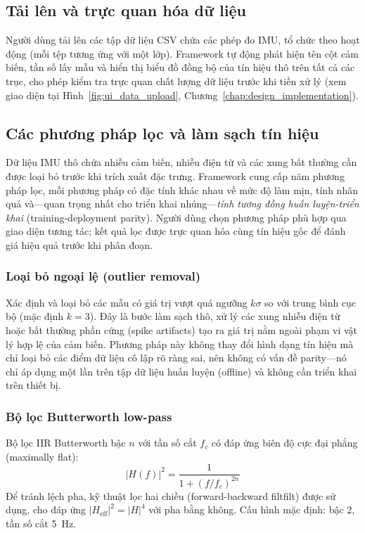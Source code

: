 \subsection{Tải lên và trực quan hóa dữ liệu}
Người dùng tải lên các tập dữ liệu CSV chứa các phép đo IMU, tổ chức theo hoạt động (mỗi tệp tương ứng với một lớp). Framework tự động phát hiện tên cột cảm biến, tần số lấy mẫu và hiển thị biểu đồ đồng bộ của tín hiệu thô trên tất cả các trục, cho phép kiểm tra trực quan chất lượng dữ liệu trước khi tiền xử lý (xem giao diện tại Hình~\ref{fig:ui_data_upload}, Chương~\ref{chap:design_implementation}).

\subsection{Các phương pháp lọc và làm sạch tín hiệu}
\label{sec:signal_filtering}

Dữ liệu IMU thô chứa nhiễu cảm biến, nhiễu điện từ và các xung bất thường cần được loại bỏ trước khi trích xuất đặc trưng. Framework cung cấp năm phương pháp lọc, mỗi phương pháp có đặc tính khác nhau về mức độ làm mịn, tính nhân quả và---quan trọng nhất cho triển khai nhúng---\textit{tính tương đồng huấn luyện-triển khai} (training-deployment parity). Người dùng chọn phương pháp phù hợp qua giao diện tương tác; kết quả lọc được trực quan hóa cùng tín hiệu gốc để đánh giá hiệu quả trước khi phân đoạn.

\subsubsection{Loại bỏ ngoại lệ (outlier removal)}
Xác định và loại bỏ các mẫu có giá trị vượt quá ngưỡng $k\sigma$ so với trung bình cục bộ (mặc định $k=3$). Đây là bước làm sạch thô, xử lý các xung nhiễu điện từ hoặc bất thường phần cứng (spike artifacts) tạo ra giá trị nằm ngoài phạm vi vật lý hợp lệ của cảm biến. Phương pháp này không thay đổi hình dạng tín hiệu mà chỉ loại bỏ các điểm dữ liệu cô lập rõ ràng sai, nên không có vấn đề parity---nó chỉ áp dụng một lần trên tập dữ liệu huấn luyện (offline) và không cần triển khai trên thiết bị.

\subsubsection{Bộ lọc Butterworth low-pass}
Bộ lọc IIR Butterworth bậc $n$ với tần số cắt $f_c$ có đáp ứng biên độ cực đại phẳng (maximally flat):
$$|H(f)|^2 = \frac{1}{1 + (f/f_c)^{2n}}$$
Để tránh lệch pha, kỹ thuật lọc hai chiều (forward-backward filtfilt) được sử dụng, cho đáp ứng $|H_{\text{eff}}|^2 = |H|^4$ với pha bằng không. Cấu hình mặc định: bậc 2, tần số cắt 5~Hz.

